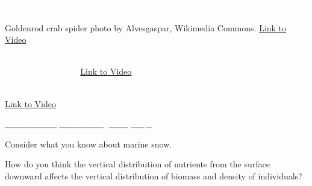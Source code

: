 \documentclass[t]{beamer}
\begin{document}
%

{
\begin{frame}[b,plain]
	\textcolor{white}{\tiny Sunflowers by Trey Ratcliff, Flickr, Creative Commons.}
\end{frame}
}

%

{
\begin{frame}[b,plain]
\tiny Goldenrod crab spider photo by Alvesgaspar, Wikimedia Commons.\hfill
\textcolor{white}{\href{https://www.youtube.com/watch?v=O9B_9XxZKJ8}{Link to Video}}
\end{frame}
}

%

{
\begin{frame}[b,plain]
	\tiny \textcolor{white}{Marine iguana on San Crist\'{o}bal Island, Galapagos by Les Williams, Flickr, Creative Commons.}\hfill
	\textcolor{white}{\href{https://www.youtube.com/watch?v=4tBWakZAGqU}{Link to Video}}
\end{frame}
}

%

{
\begin{frame}[b,plain]
	\tiny\textcolor{white}{Greater Bird of Paradise \textcopyright Tim Laman, All Rights Reserved. Used with permission. \hfill\href{http://www.youtube.com/watch?v=KIYkpwyKEhY}{Link to Video} }
\end{frame}
}

%

{
\begin{frame}[t]

\tinyfill \href{https://hechingerreport.org/will-giving-greater-student-access-smartphones-improve-learning/}{\textcolor{white}{Paul Barnwell, The Hechinger Report, .}}
\end{frame}
}



%

\begin{frame}[t]{Consider what you know about marine snow.}

\hangpara How do you think the vertical distribution of nutrients from the surface downward affects the vertical distribution of biomass and density of individuals?

\end{frame}
\end{document}
